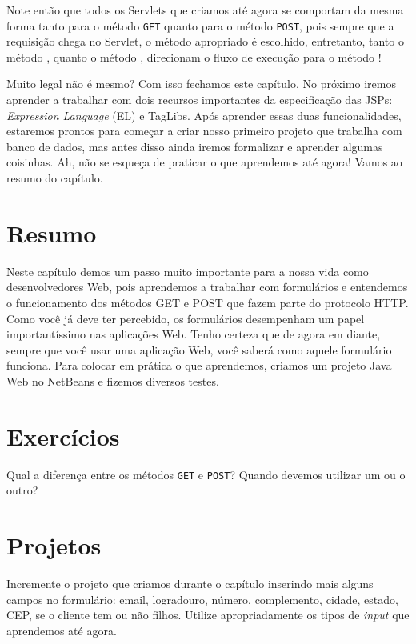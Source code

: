 Note então que todos os Servlets que criamos até agora se comportam da mesma forma tanto para o método \texttt{GET} quanto para o método \texttt{POST}, pois sempre que a requisição chega no Servlet, o método apropriado é escolhido, entretanto, tanto o método , quanto o método , direcionam o fluxo de execução para o método !
 
Muito legal não é mesmo? Com isso fechamos este capítulo. No próximo iremos aprender a trabalhar com dois recursos importantes da especificação das JSPs: \textit{Expression Language} (EL) e TagLibs. Após aprender essas duas funcionalidades, estaremos prontos para começar a criar nosso primeiro projeto que trabalha com banco de dados, mas antes disso ainda iremos formalizar e aprender algumas coisinhas. Ah, não se esqueça de praticar o que aprendemos até agora! Vamos ao resumo do capítulo.


\section{Resumo}

Neste capítulo demos um passo muito importante para a nossa vida como desenvolvedores Web, pois aprendemos a trabalhar com formulários e entendemos o funcionamento dos métodos GET e POST que fazem parte do protocolo HTTP. Como você já deve ter percebido, os formulários desempenham um papel importantíssimo nas aplicações Web. Tenho certeza que de agora em diante, sempre que você usar uma aplicação Web, você saberá como aquele formulário funciona. Para colocar em prática o que aprendemos, criamos um projeto Java Web no NetBeans e fizemos diversos testes.

\section{Exercícios}

\begin{exercicioSemArquivo}{}{}{}
    Qual a diferença entre os métodos \texttt{GET} e \texttt{POST}? Quando devemos utilizar um ou o outro?
\end{exercicioSemArquivo}

\section{Projetos}

\begin{projetoSemArquivo}{}{}{}
    Incremente o projeto que criamos durante o capítulo inserindo mais alguns campos no formulário: email, logradouro, número, complemento, cidade, estado, CEP, se o cliente tem ou não filhos. Utilize apropriadamente os tipos de \textit{input} que aprendemos até agora.
\end{projetoSemArquivo}

